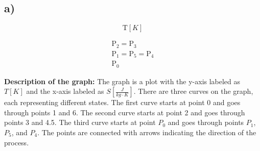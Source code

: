 

\subsection*{a)}

\[
\text{T} [K]
\]

\[
\begin{array}{c}
\text{P}_2 = \text{P}_3 \\
\text{P}_1 = \text{P}_5 = \text{P}_4 \\
\text{P}_0
\end{array}
\]

\noindent
\textbf{Description of the graph:} The graph is a plot with the y-axis labeled as \( T[K] \) and the x-axis labeled as \( S \left[ \frac{J}{kg \cdot K} \right] \). There are three curves on the graph, each representing different states. The first curve starts at point 0 and goes through points 1 and 6. The second curve starts at point 2 and goes through points 3 and 4.5. The third curve starts at point \( P_0 \) and goes through points \( P_1 \), \( P_5 \), and \( P_4 \). The points are connected with arrows indicating the direction of the process.